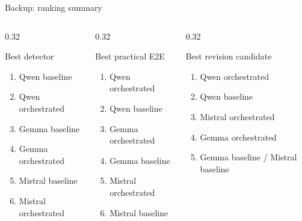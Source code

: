 \documentclass[aspectratio=169,10pt]{beamer}
\newcommand{\tight}{\setlength{\itemsep}{2pt}\setlength{\parskip}{0pt}}
\begin{document}
\begin{frame}{Backup: ranking summary}
\begin{columns}[T,onlytextwidth]
\begin{column}{0.32\textwidth}
\begin{block}{Best detector}
\begin{enumerate}\tight
  \item Qwen baseline
  \item Qwen orchestrated
  \item Gemma baseline
  \item Gemma orchestrated
  \item Mistral baseline
  \item Mistral orchestrated
\end{enumerate}
\end{block}
\end{column}
\begin{column}{0.32\textwidth}
\begin{block}{Best practical E2E}
\begin{enumerate}\tight
  \item Qwen orchestrated
  \item Qwen baseline
  \item Gemma orchestrated
  \item Gemma baseline
  \item Mistral orchestrated
  \item Mistral baseline
\end{enumerate}
\end{block}
\end{column}
\begin{column}{0.32\textwidth}
\begin{block}{Best revision candidate}
\begin{enumerate}\tight
  \item Qwen orchestrated
  \item Qwen baseline
  \item Mistral orchestrated
  \item Gemma orchestrated
  \item Gemma baseline / Mistral baseline
\end{enumerate}
\end{block}
\end{column}
\end{columns}
\end{frame}
\end{document}
